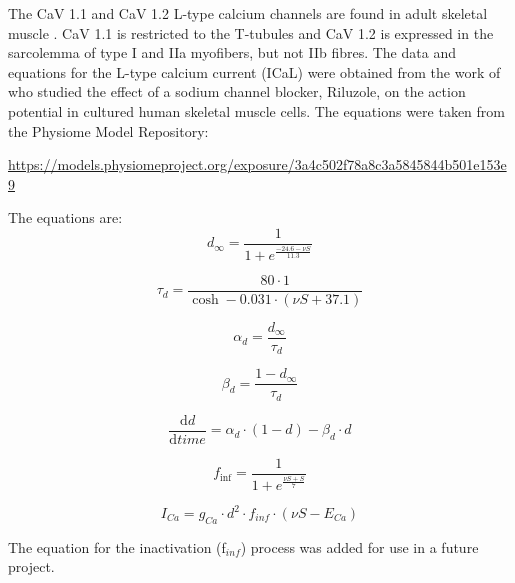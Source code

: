 \documentclass[fleqn,10pt]{physiome}
\begin{document}
The CaV 1.1 and CaV 1.2 L-type calcium channels are found in adult skeletal muscle \citep{jeftinija2007cav, flucher2017and} . CaV 1.1 is restricted to the T-tubules and CaV 1.2 is expressed in the sarcolemma of type I and IIa myofibers, but not IIb fibres.   The data and equations for the L-type calcium current (ICaL) were obtained from the work of \citet{wang2008riluzole} who studied the effect of a sodium channel blocker, Riluzole, on the action potential in cultured human skeletal muscle cells. The equations were taken from the Physiome Model Repository: 

\url{https://models.physiomeproject.org/exposure/3a4c502f78a8c3a5845844b501e153e9}\newline

The equations are:
\begin{equation}
d_{\infty} = \frac{\displaystyle 1}{\displaystyle 1+ e^{\frac{\scriptstyle -24.6-\nu{S}}{\scriptstyle 11.3}}}
\end{equation}

\begin{equation}
\tau_d = \frac{\displaystyle 80\cdot 1}{\displaystyle \cosh -0.031\cdot \left( \nu{S}+37.1 \right)}
\end{equation}

\begin{equation}
\alpha_{d} = \frac{\displaystyle d_{\infty}}{\displaystyle \tau_{d}} 
\end{equation}

\begin{equation}
\beta_{d} = \frac{\displaystyle 1-d_{\infty}}{\displaystyle \tau_{d}} 
\end{equation}

\begin{equation}
\frac{\displaystyle \textrm{d}d}{\displaystyle \textrm{d}time} = \alpha_{d}\cdot \left( 1-d \right) -\beta_{d}\cdot d
\end{equation}

\begin{equation}
f_{\inf} = \frac{1}{1+e^\frac{\nu{S}+S}{7}}
\end{equation}

\begin{equation}
I_{Ca} = g_{Ca}\cdot d^{\scriptstyle 2}\cdot f_{inf}\cdot \left( \nu{S}-E_{Ca} \right)     
\end{equation}

The equation for the inactivation (f$_{inf}$) process was added for use in a future project.\newline 
\end{document}
